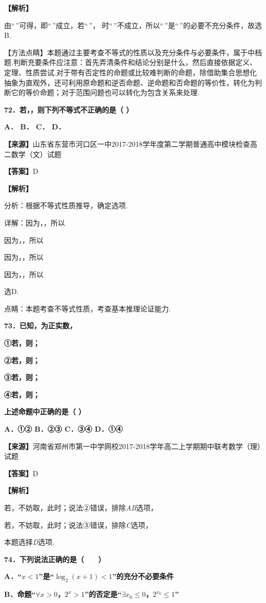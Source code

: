 \documentclass[
]{article}
\begin{document}
\textbf{【解析】}

由``\,''可得，即``\,''成立，若``\,''，
时``\,''不成立，所以``\,''是``\,''的必要不充分条件，故选B.

【方法点睛】本题通过主要考查不等式的性质以及充分条件与必要条件，属于中档题.判断充要条件应注意：首先弄清条件和结论分别是什么，然后直接依据定义、定理、性质尝试.对于带有否定性的命题或比较难判断的命题，除借助集合思想化抽象为直观外，还可利用原命题和逆否命题、逆命题和否命题的等价性，转化为判断它的等价命题；对于范围问题也可以转化为包含关系来处理.

\textbf{72．若，，则下列不等式不正确的是（ ）}

\textbf{A． B． C． D．}

\textbf{【来源】}山东省东营市河口区一中2017-2018学年度第二学期普通高中模块检查高二数学（文）试题

\textbf{【答案】}D

\textbf{【解析】}

分析：根据不等式性质推导，确定选项.

详解：因为，，所以

因为，，所以

因为，，所以

因为，，所以

选D.

点睛：本题考查不等式性质，考查基本推理论证能力.

\textbf{73．已知，为正实数，}

\textbf{①若，则；}

\textbf{②若，则；}

\textbf{③若，则；}

\textbf{④若，则；}

\textbf{上述命题中正确的是（ ）}

\textbf{A．①② B．②③ C．③④ D．①④}

\textbf{【来源】}河南省郑州市第一中学网校2017-2018学年高二上学期期中联考数学（理）试题

\textbf{【答案】}D

\textbf{【解析】}

若，不妨取，此时；说法②错误，排除\emph{AB}选项，

若，不妨取，此时；说法③错误，排除\emph{C}选项，

本题选择\emph{D}选项.

\textbf{74．下列说法正确的是（　　）}

\textbf{A．``}\(x < 1\)\textbf{''是``}\(\log_{2}\left( x + 1 \right) < 1\)\textbf{''的充分不必要条件}

\textbf{B．命题``}\(\forall x > 0\)\textbf{，}\(2^{x} > 1\)\textbf{''的否定是``}\(\exists x_{0} \leq 0\)\textbf{，}\(2^{x_{0}} \leq 1\)\textbf{''}
\end{document}
